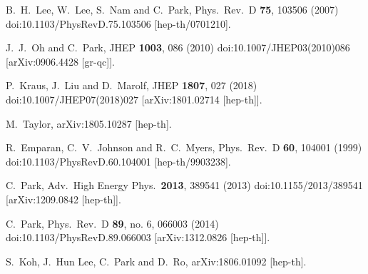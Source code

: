 \documentclass[12pt]{article}
\begin{document}
\begin{thebibliography}{99}
  B.~H.~Lee, W.~Lee, S.~Nam and C.~Park,
  Phys.\ Rev.\ D {\bf 75}, 103506 (2007)
  doi:10.1103/PhysRevD.75.103506
  [hep-th/0701210].
  
  J.~J.~Oh and C.~Park,
  JHEP {\bf 1003}, 086 (2010)
  doi:10.1007/JHEP03(2010)086
  [arXiv:0906.4428 [gr-qc]].
  
  P.~Kraus, J.~Liu and D.~Marolf,
  JHEP {\bf 1807}, 027 (2018)
  doi:10.1007/JHEP07(2018)027
  [arXiv:1801.02714 [hep-th]].
  
  M.~Taylor,
  arXiv:1805.10287 [hep-th].
  
  
  R.~Emparan, C.~V.~Johnson and R.~C.~Myers,
  Phys.\ Rev.\ D {\bf 60}, 104001 (1999)
  doi:10.1103/PhysRevD.60.104001
  [hep-th/9903238].
  
  C.~Park,
  Adv.\ High Energy Phys.\  {\bf 2013}, 389541 (2013)
  doi:10.1155/2013/389541
  [arXiv:1209.0842 [hep-th]].
  
  C.~Park,
  Phys.\ Rev.\ D {\bf 89}, no. 6, 066003 (2014)
  doi:10.1103/PhysRevD.89.066003
  [arXiv:1312.0826 [hep-th]].
  
  S.~Koh, J.~Hun Lee, C.~Park and D.~Ro,
  arXiv:1806.01092 [hep-th].
  
\end{thebibliography}
\end{document}
